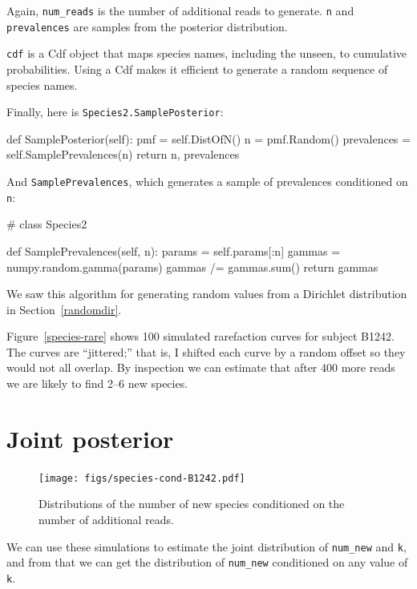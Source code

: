 \documentclass[12pt]{book}
\theoremstyle{exercise}
\begin{document}
Again, \verb"num_reads" is the number of additional reads
to generate.  {\tt n} and {\tt prevalences} are samples from
the posterior distribution.

{\tt cdf} is a Cdf object that maps species names, including the
unseen, to cumulative probabilities.  Using a Cdf makes it efficient
to generate a random sequence of species names.

Finally, here is {\tt Species2.SamplePosterior}:

\begin{code}
    def SamplePosterior(self):
        pmf = self.DistOfN()
        n = pmf.Random()
        prevalences = self.SamplePrevalences(n)
        return n, prevalences
\end{code}

And {\tt SamplePrevalences}, which generates a sample of
prevalences conditioned on {\tt n}:

\begin{code}
# class Species2

    def SamplePrevalences(self, n):
        params = self.params[:n]
        gammas = numpy.random.gamma(params)
        gammas /= gammas.sum()
        return gammas
\end{code}

We saw this algorithm for generating random values from a Dirichlet
distribution in Section~\ref{randomdir}.

Figure~\ref{species-rare} shows 100 simulated rarefaction curves
for subject B1242.  The curves are ``jittered;''
that is, I shifted each curve by a random offset so they
would not all overlap.  By inspection we can estimate that after
400 more reads we are likely to find 2--6 new species.


\section{Joint posterior}

\begin{figure}
\centerline{\texttt{[image: figs/species-cond-B1242.pdf]}}
\caption{Distributions of the number of new species conditioned on
the number of additional reads.}
\label{species-cond}
\end{figure}

We can use these simulations to estimate the
joint distribution of \verb"num_new" and {\tt k}, and from that
we can get the distribution of \verb"num_new" conditioned on any
value of {\tt k}.
\end{document}
